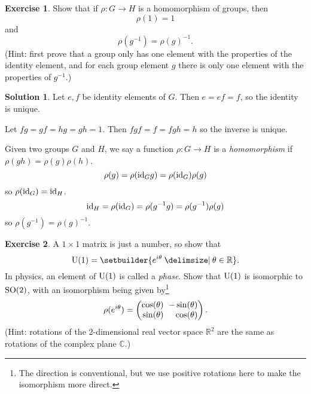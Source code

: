 \documentclass[11pt, a4paper]{report}
\theoremstyle{definition}
\newtheorem{exercise}{Exercise}[part]
\newtheorem{solution}{Solution}[part]
\newenvironment{ex}{\begin{exercise}}{\end{exercise}\pagebreak[1]}
\newenvironment{sol}{\begin{solution}}{\end{solution}\pagebreak[3]}
\newcommand*{\settightmatrix}{\ensuremath\setlength{\arraycolsep}{0.7ex}}
\newcommand*{\SO}{\ensuremath\text{SO}}
\newcommand*{\U}{\ensuremath\text{U}}
\newcommand*{\op}[1]{\ensuremath\mathop{}\mathopen{}#1}
\newcommand*{\id}{\op{\mathrm{id}}}
\begin{document}
\begin{ex}

Show that if $\rho: G \to H$ is a homomorphism of groups, then
\[
    \rho(1) = 1
\]
and
\[
    \rho(g^{-1}) = {\rho(g)}^{-1}.
\]
(Hint: first prove that a group only has one element with the properties of the identity element, and for each group element $g$ there is only one element with the properties of $g^{-1}$.)

\end{ex}

\begin{sol}

Let $e, f$ be identity elements of $G$. Then $e = ef = f$, so the identity is unique.

Let $fg = gf = hg = gh = 1$. Then $fgf = f = fgh = h$ so the inverse is unique.

Given two groups $G$ and $H$, we say a function $\rho: G \to H$ is a \emph{homomorphism} if $\rho(gh) = \rho(g) \rho(h)$.
\[
    \rho(g) = \rho(\id_G g) = \rho(\id_G) \rho(g)
\]
so $\rho(\id_G) = \id_H$.
\[
    \id_H = \rho(\id_G) = \rho(g^{-1} g) = \rho(g^{-1}) \rho(g)
\]
so $\rho(g^{-1}) = {\rho(g)}^{-1}$.

\end{sol}

\begin{ex}

A $1 \times 1$ matrix is just a number, so show that
\[
    \U(1) = \setbuilder{e^{i\theta} \given \theta \in \mathbb{R}}.
\]
In physics, an element of $\U(1)$ is called a \emph{phase}.
Show that $\U(1)$ is isomorphic to $\SO(2)$, with an isomorphism being given by\footnote{The direction is conventional, but we use positive rotations here to make the isomorphism more direct.}
\[
    \settightmatrix
    \rho(e^{i\theta}) =
        \begin{pmatrix*}[r]
            \cos(\theta) & -\sin(\theta) \\
            \sin(\theta) & \cos(\theta)
        \end{pmatrix*}.
\]
(Hint: rotations of the 2-dimensional real vector space $\mathbb{R}^2$ are the same as rotations of the complex plane $\mathbb{C}$.)

\end{ex}
\end{document}
